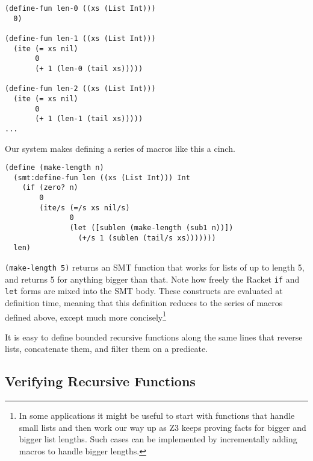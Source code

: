 \begin{verbatim}
(define-fun len-0 ((xs (List Int)))
  0)

(define-fun len-1 ((xs (List Int)))
  (ite (= xs nil)
       0
       (+ 1 (len-0 (tail xs)))))

(define-fun len-2 ((xs (List Int)))
  (ite (= xs nil)
       0
       (+ 1 (len-1 (tail xs)))))
...
\end{verbatim}

Our system makes defining a series of macros like this a cinch.

\begin{verbatim}
(define (make-length n)
  (smt:define-fun len ((xs (List Int))) Int
    (if (zero? n)
        0
        (ite/s (=/s xs nil/s)
               0
               (let ([sublen (make-length (sub1 n))])
                 (+/s 1 (sublen (tail/s xs)))))))
  len)
\end{verbatim}

\texttt{(make-length 5)} returns an SMT function that works for lists of up to
length 5, and returns 5 for anything bigger than that. Note how freely the
Racket \texttt{if} and \texttt{let} forms are mixed into the SMT body. These
constructs are evaluated at definition time, meaning that this definition
reduces to the series of macros defined above, except much more
concisely\footnote{In some applications it might be useful to start with
functions that handle small lists and then work our way up as Z3 keeps proving
facts for bigger and bigger list lengths. Such cases can be implemented by
incrementally adding macros to handle bigger lengths.}

It is easy to define bounded recursive functions along the same lines that
reverse lists, concatenate them, and filter them on a predicate.

\subsection{Verifying Recursive Functions}

